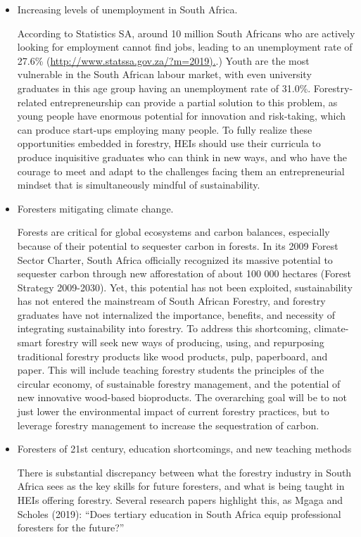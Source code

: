 \documentclass[
  11pt,
]{article}
\begin{document}
\begin{itemize}
\item
  Increasing levels of unemployment in South Africa.

  According to Statistics SA, around 10 million South Africans who are
  actively looking for employment cannot find jobs, leading to an
  unemployment rate of 27.6\%
  (\href{http://www.statssa.gov.za/?m=2019}{http://www.statssa.gov.za/?m=2019).}.)
  Youth are the most vulnerable in the South African labour market, with
  even university graduates in this age group having an unemployment
  rate of 31.0\%. Forestry-related entrepreneurship can provide a
  partial solution to this problem, as young people have enormous
  potential for innovation and risk-taking, which can produce start-ups
  employing many people. To fully realize these opportunities embedded
  in forestry, HEIs should use their curricula to produce inquisitive
  graduates who can think in new ways, and who have the courage to meet
  and adapt to the challenges facing them an entrepreneurial mindset
  that is simultaneously mindful of sustainability.
\item
  Foresters mitigating climate change.

  Forests are critical for global ecosystems and carbon balances,
  especially because of their potential to sequester carbon in forests.
  In its 2009 Forest Sector Charter, South Africa officially recognized
  its massive potential to sequester carbon through new afforestation of
  about 100 000 hectares (Forest Strategy 2009-2030). Yet, this
  potential has not been exploited, sustainability has not entered the
  mainstream of South African Forestry, and forestry graduates have not
  internalized the importance, benefits, and necessity of integrating
  sustainability into forestry. To address this shortcoming,
  climate-smart forestry will seek new ways of producing, using, and
  repurposing traditional forestry products like wood products, pulp,
  paperboard, and paper. This will include teaching forestry students
  the principles of the circular economy, of sustainable forestry
  management, and the potential of new innovative wood-based
  bioproducts. The overarching goal will be to not just lower the
  environmental impact of current forestry practices, but to leverage
  forestry management to increase the sequestration of carbon.
\item
  Foresters of 21st century, education shortcomings, and new teaching
  methods

  There is substantial discrepancy between what the forestry industry in
  South Africa sees as the key skills for future foresters, and what is
  being taught in HEIs offering forestry. Several research papers
  highlight this, as Mgaga and Scholes (2019): ``Does tertiary education
  in South Africa equip professional foresters for the future?''
\end{itemize}
\end{document}
